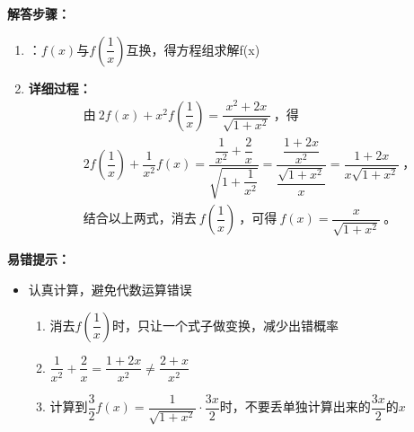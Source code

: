 \documentclass{ctexart}
\begin{document}
\begin{solution}

\textbf{解答步骤：}
\begin{enumerate}
    \item {}：$f(x)$与$f\left(\dfrac{1}{x}\right)$互换，得方程组求解f(x)
    
    \item \textbf{详细过程：}
    \[ \begin{aligned}
    &\text{由}\ 2 f(x)+x^{2} f\left(\dfrac{1}{x}\right)=\dfrac{x^{2}+2 x}{\sqrt{1+x^{2}}}\ \text{，得} \\
    &2 f\left(\dfrac{1}{x}\right)+\dfrac{1}{x^{2}} f(x)=\dfrac{\dfrac{1}{x^{2}}+\dfrac{2}{x}}{\sqrt{1+\dfrac{1}{x^{2}}}}
    =\dfrac{\dfrac{1+2 x}{x^{2}}}{\dfrac{\sqrt{1+x^{2}}}{x}}=\dfrac{1+2 x}{x \sqrt{1+x^{2}}}\ \text{，}\\
    &\text{结合以上两式，消去}\ f\left(\dfrac{1}{x}\right)\ \text{，可得}\ f(x)=\dfrac{x}{\sqrt{1+x^{2}}}\ \text{。}
    \end{aligned} \]
    
\end{enumerate}


\textbf{易错提示：}
\begin{itemize}
    \item 认真计算，避免代数运算错误
        \begin{enumerate}
            \item 消去$f\left(\dfrac{1}{x}\right)$时，只让一个式子做变换，减少出错概率
            \item $\dfrac{1}{x^2}+\dfrac{2}{x}=\dfrac{1+2x}{x^2}\neq\dfrac{2+x}{x^2}$
            \item 计算到$\dfrac{3}{2}f(x)=\dfrac{1}{\sqrt{1+x^2}}\cdot\dfrac{3x}{2}$时，不要丢单独计算出来的$\dfrac{3x}{2}$的$x$
        \end{enumerate}
\end{itemize}

\end{solution}
\end{document}
